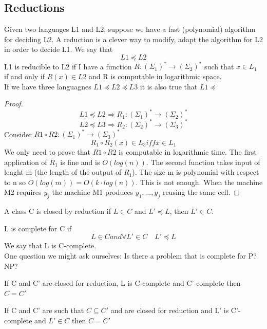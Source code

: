 \subsection{Reductions}
Given two languages L1 and L2, suppose we have a fast (polynomial) algorithm for deciding L2. A reduction is a clever way to modify, adapt the algorithm for L2 in order to decide L1. We say that
\[ 
    L1 \preceq L2 
\]
L1 is reducible to L2 if I have a function $R:(\Sigma_1)^* \longrightarrow (\Sigma_2)^*$ such that $x \in L_1$ if and only if $R(x) \in L2$ and R is computable in logarithmic space.\\
If we have three languagnes $ L1 \preceq L2 \preceq L3 $ it is also true that $L1 \preceq$
\begin{proof}
    \[ 
        L1 \preceq L2 \Rightarrow R_1: (\Sigma_1)^*\longrightarrow(\Sigma_2)^* 
    \]
    \[ 
        L2 \preceq L3 \Rightarrow R_2: (\Sigma_2)^*\longrightarrow(\Sigma_3)^* 
    \]
    Consider $R1 \circ R2 : (\Sigma_1)^* \longrightarrow (\Sigma_3)^*$
    \[ 
        R_1 \circ R_2 (x) \in L_3 iff x \in L_1 
    \] We only need to prove that $R1 \circ R2$ is computable in logarithmic time. The first application of $R_1$ is fine and is $O(log(n))$. The second function takes input of lenght m (the length of the output of $R_1$). The size m is polynomial with respect to n so $O(log(m)) = O(k\cdot log(n))$. This is not enough. When the machine M2 requires $y_j$ the machine M1 produces $y_{1}, \ldots,y_{j}$ reusing the same cell.
\end{proof}
\begin{definition}
    A class C is closed by reduction if $L \in C$ and $L' \preceq L$, then $L' \in C$. 
\end{definition}
\begin{definition}
    L is complete for C if
    \[ 
        L \in C and \forall L' \in C \quad L'\preceq L 
    \]We say that L is C-complete.\\
    One question we might ask ourselves: Is there a problem that is complete for P? NP?
\end{definition}
\begin{property}
    If C and C' are closed for reduction, L is C-complete and C'-complete then $C = C'$
\end{property}
\begin{property}
    If C and C' are such that $C \subseteq C'$ and are closed for reduction and L' is C'-complete and $L' \in C$ then $C = C'$
\end{property}
